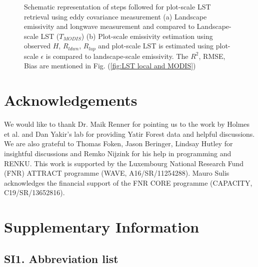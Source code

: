 \documentclass[fleqn,10pt]{wlscirep}
\begin{document}
{\begin{figure}[h!]
\begin{subfigure}{.5\textwidth}
{}
\end{subfigure}
\caption{Schematic representation of steps followed for plot-scale LST retrieval using eddy covariance measurement (a) Landscape emissivity and longwave measurement and compared to Landscape-scale LST ($T_{MODIS}$) (b) Plot-scale emissivity estimation using observed $H$, $R_{ldwn}$, $R_{lup}$ and plot-scale LST is estimated using plot-scale $\epsilon$ is compared to landscape-scale emissivity. The $R^{2}$, RMSE, Bias are mentioned in Fig. (\ref{fig:LST local and MODIS})}
\label{fig:flow_chart}
\end{figure}





\section{Acknowledgements}
We would like to thank Dr. Maik Renner for pointing us to the work by Holmes et al. and Dan Yakir's lab for providing Yatir Forest data and helpful discussions. We are also grateful to Thomas Foken, Jason Beringer, Lindsay Hutley for insightful discussions and Remko Nijzink for his help in programming and RENKU. This work is supported by the Luxembourg National Research Fund (FNR) ATTRACT programme (WAVE, A16/SR/11254288). Mauro Sulis acknowledges the financial support of the FNR CORE programme (CAPACITY, C19/SR/13652816).


%



%

\section{Supplementary Information}
\subsection*{SI1. Abbreviation list}
\begin{table}[h!]


\end{table}}
\end{document}

